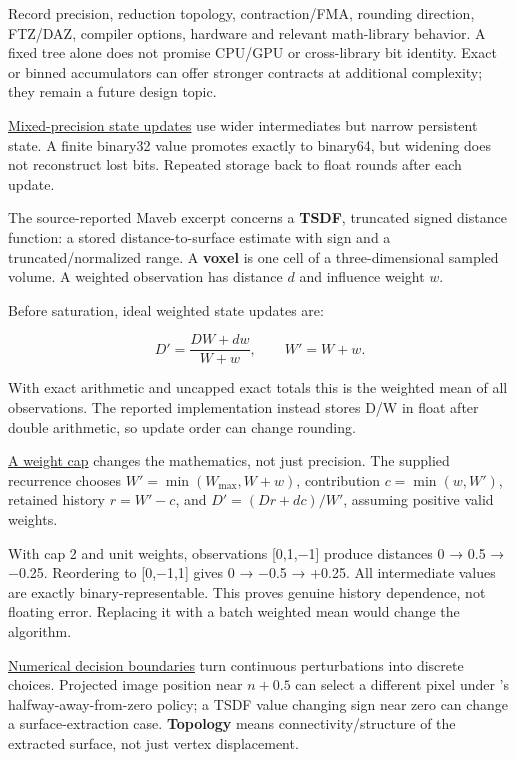 Record precision, reduction topology, contraction/FMA, rounding direction, FTZ/DAZ, compiler options, hardware and relevant math-library behavior. A fixed tree alone does not promise CPU/GPU or cross-library bit identity. Exact or binned accumulators can offer stronger contracts at additional complexity; they remain a future design topic.

\hyperref[appendix-260182e617b7]{Mixed-precision state updates} use wider intermediates but narrow persistent state. A finite binary32 value promotes exactly to binary64, but widening does not reconstruct lost bits. Repeated storage back to float rounds after each update.

The source-reported Maveb excerpt concerns a \textbf{TSDF}, truncated signed distance function: a stored distance-to-surface estimate with sign and a truncated/normalized range. A \textbf{voxel} is one cell of a three-dimensional sampled volume. A weighted observation has distance \(d\) and influence weight \(w\).

Before saturation, ideal weighted state updates are:

\[
D'=\frac{DW+dw}{W+w},\qquad W'=W+w.
\]

With exact arithmetic and uncapped exact totals this is the weighted mean of all observations. The reported implementation instead stores D/W in float after double arithmetic, so update order can change rounding.

\hyperref[appendix-1e45d0613db3]{A weight cap} changes the mathematics, not just precision. The supplied recurrence chooses \(W'=\min(W_{\max},W+w)\), contribution \(c=\min(w,W')\), retained history \(r=W'-c\), and \(D'=(Dr+dc)/W'\), assuming positive valid weights.

With cap 2 and unit weights, observations {[}0,1,−1{]} produce distances 0 → 0.5 → −0.25. Reordering to {[}0,−1,1{]} gives 0 → −0.5 → +0.25. All intermediate values are exactly binary-representable. This proves genuine history dependence, not floating error. Replacing it with a batch weighted mean would change the algorithm.

\hyperref[appendix-c80db39080be]{Numerical decision boundaries} turn continuous perturbations into discrete choices. Projected image position near \(n+0.5\) can select a different pixel under 's halfway-away-from-zero policy; a TSDF value changing sign near zero can change a surface-extraction case. \textbf{Topology} means connectivity/structure of the extracted surface, not just vertex displacement.

